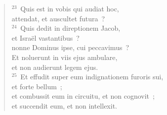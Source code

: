 \begin{verse}
${}^{23}$~Quis est in vobis qui audiat hoc,\\ attendat, et auscultet futura~?\\
${}^{24}$~Quis dedit in direptionem Jacob,\\ et Isra\"el vastantibus~?\\ nonne Dominus ipse, cui peccavimus~?\\ Et noluerunt in viis ejus ambulare,\\ et non audierunt legem ejus.\\
${}^{25}$~Et effudit super eum indignationem furoris sui,\\ et forte bellum~;\\ et combussit eum in circuitu, et non cognovit~;\\ et succendit eum, et non intellexit.\end{verse}


